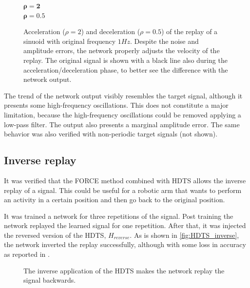 \documentclass[10pt,a4paper, final]{report} %
\begin{document}
\begin{figure}[H]
\centering
$\bm{\rho=2}$
\\
$\bm{\rho=0.5}$
\caption{Acceleration ($\rho=2$) and deceleration ($\rho=0.5$) of the replay of a sinuoid with original frequency $1 Hz$. Despite the noise and amplitude errors, the network properly adjusts the velocity of the replay. The original signal is shown with a black line also during the acceleration/deceleration phase, to better see the difference with the network output.}
\label{fig:HDTS_speedup_replay}
\end{figure}

The trend of the network output visibly resembles the target signal, although it presents some high-frequency oscillations. This does not constitute a major limitation, because the high-frequency oscillations could be removed applying a low-pass filter. The output also presents a marginal amplitude error. The same behavior was also verified with non-periodic target signals (not shown).

\subsection{Inverse replay}
It was verified that the FORCE method combined with HDTS allows the inverse replay of a signal. This could be useful for a robotic arm that wants to perform an activity in a certain position and then go back to the original position. 

It was trained a network for three repetitions of the signal. Post training the network replayed the learned signal for one repetition. After that, it was injected the reversed version of the HDTS, $H_{reverse}$. As is shown in \autoref{fig:HDTS_inverse}, the network inverted the replay successfully, although with some loss in accuracy as reported in \cite{nicola2017supervised}.


\begin{figure}[H]
\centering
{}
\caption{The inverse application of the HDTS makes the network replay the signal backwards.}
\label{fig:HDTS_inverse}
\end{figure}
\end{document}
